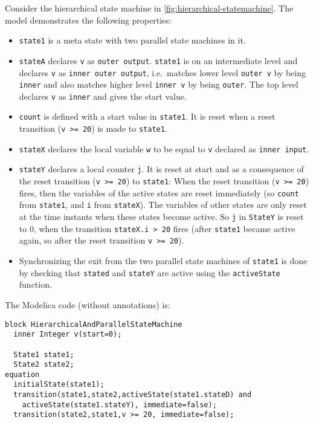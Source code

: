 \begin{example}
Consider the hierarchical state machine in \cref{fig:hierarchical-statemachine}.  The model demonstrates the following properties:
\begin{itemize}
\item
  \lstinline!state1! is a meta state with two parallel state machines in it.
\item
  \lstinline!stateA! declares \lstinline!v! as \lstinline!outer output!. \lstinline!state1! is on an intermediate
  level and declares \lstinline!v! as \lstinline!inner outer output!, i.e.\ matches lower level
  \lstinline!outer v! by being \lstinline!inner! and also matches higher level \lstinline!inner v! by being
  \lstinline!outer!. The top level declares \lstinline!v! as \lstinline!inner! and gives the start value.
\item
  \lstinline!count! is defined with a start value in \lstinline!state1!. It is reset when
  a reset transition (\lstinline!v >= 20!) is made to \lstinline!state1!.
\item
  \lstinline!stateX! declares the local variable \lstinline!w! to be equal to \lstinline!v! declared
  as \lstinline!inner input!.
\item
  \lstinline!stateY! declares a local counter \lstinline!j!. It is reset at start and as a
  consequence of the reset transition (\lstinline!v >= 20!) to \lstinline!state1!:
  When the reset transition (\lstinline!v >= 20!) fires, then the variables of the
  active states are reset immediately (so \lstinline!count! from \lstinline!state1!, and \lstinline!i!
  from \lstinline!stateX!). The variables of other states are only reset at the time
  instants when these states become active. So \lstinline!j! in \lstinline!StateY! is reset to
  0, when the transition \lstinline!stateX.i > 20! fires (after \lstinline!state1!
  became active again, so after the reset transition \lstinline!v >= 20!).
\item
  Synchronizing the exit from the two parallel state machines of
  \lstinline!state1! is done by checking that \lstinline!stated! and \lstinline!stateY! are active using the
  \lstinline!activeState! function.
\end{itemize}

The Modelica code (without annotations) is:
\begin{lstlisting}[language=modelica]
block HierarchicalAndParallelStateMachine
  inner Integer v(start=0);

  State1 state1;
  State2 state2;
equation
  initialState(state1);
  transition(state1,state2,activeState(state1.stateD) and
    activeState(state1.stateY), immediate=false);
  transition(state2,state1,v >= 20, immediate=false);


\end{lstlisting}
\end{example}
